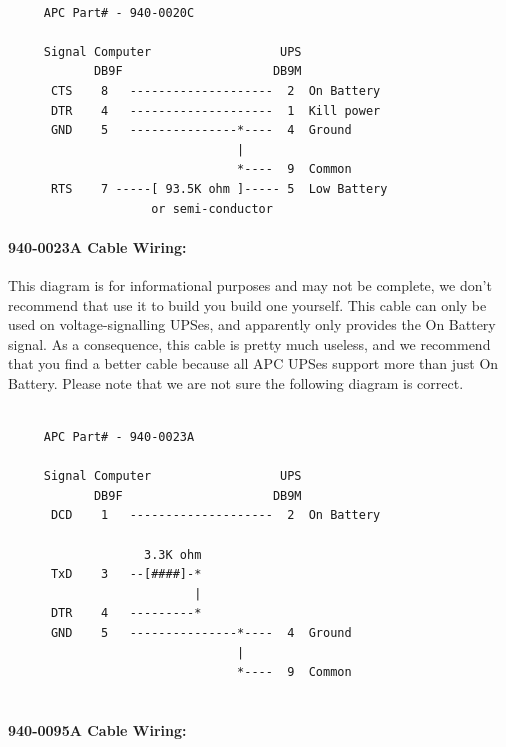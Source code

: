 {{{{{{{{{{\footnotesize
\begin{verbatim}
     
     APC Part# - 940-0020C
     
     Signal Computer                  UPS
            DB9F                     DB9M
      CTS    8   --------------------  2  On Battery
      DTR    4   --------------------  1  Kill power
      GND    5   ---------------*----  4  Ground
                                |
                                *----  9  Common
      RTS    7 -----[ 93.5K ohm ]----- 5  Low Battery
                    or semi-conductor
\end{verbatim}
\normalsize

\label{940_002d0023A-Cable-Wiring}

\paragraph*{940-0023A Cable Wiring:}

\label{index-Cables-205}
This diagram is for informational purposes and may not be complete, we don't
recommend that use it to build you build one yourself.  This cable can only be
used on voltage-signalling UPSes, and apparently only provides the On Battery
signal. As a consequence, this cable is pretty much useless, and we recommend
that you find a better cable because all APC UPSes support more than just On
Battery. Please note that we are not sure the following diagram is correct. 

\footnotesize
\begin{verbatim}
     
     APC Part# - 940-0023A
     
     Signal Computer                  UPS
            DB9F                     DB9M
      DCD    1   --------------------  2  On Battery
     
                   3.3K ohm
      TxD    3   --[####]-*
                          |
      DTR    4   ---------*
      GND    5   ---------------*----  4  Ground
                                |
                                *----  9  Common
     
\end{verbatim}
\normalsize

\label{940_002d0095A-Cable-Wiring}

\paragraph*{940-0095A Cable Wiring:}

}}}}}}}}}}
